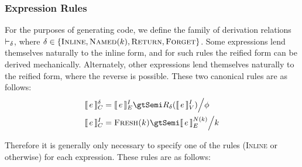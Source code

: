 \documentclass[10pt]{article}
\begin{document}
\subsubsection{Expression Rules}

For the purposes of generating code, we define the family of derivation relations $\vdash_{\delta}$, where
$\delta \in \{\textsc{Inline}, \textsc{Named$(k)$}, \textsc{Return}, \textsc{Forget}\}$. Some
expressions lend themselves naturally to the inline form, and for such rules the reified form
can be derived mechanically. Alternately, other expressions lend themselves naturally to the
reified form, where the reverse is possible. These two canonical rules are as follows:
%
\begin{align*}
    \intCD{e} &= \intEI{e} \gtSemi R_\delta(\intVI{e}) \with \phi \\
    \intCI{e} &= \Fresh{k} \gtSemi \intE{N(k)}{e} \with k \\
\end{align*}

Therefore it is generally only necessary to specify one of the rules (\textsc{Inline} or
otherwise) for each expression. These rules are as follows:
\end{document}
